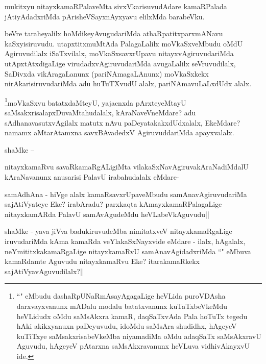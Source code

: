 \begin{artha}
mukitxyu nitayxkamaRPalaveMta sivxVkarisuvudAdare kamaRPalada jAtiyAdadxriMda pArisheVSayxnAyxyavu elilxMda barabeVku.
\end{artha}

\begin{artha}
beVre taraheyalilx hoMdikeyAvugudariMda athaRpatitxparxmANavu kaSxyisiruvudu. utapxtitxmuMtAda PalagaLalilx moVkaSxveMbudu oMdU Agiruvudilalx iSaTxvilalx, moVkaSxsavxrUpavu nitayxvAgiruvudariMda utApxtAtxdigaLige virudadxvAgiruvudariMda avugaLalilx seVruvudilalx, SaDivxda vikAragaLanunx (pariNAmagaLAnunx) moVkaSxkekx nirAkarisiruvudariMda adu huTuTXvudU alalx, pariNAmavuLaLxdUdx alalx.
\end{artha}

\begin{artha}
\footnote{``\stext" eMbudu dashaRpUNaRmAsayAgagaLige heVLida puroVDAsha darxvayxvanunx mADalu modalu batatxvanunx kuTaTxbeVkeMdu heVLidudx oMdu saMsAkxra kamaR, daqSaTxvAda Pala hoTuTx tegedu hAki akikxyanuxn paDeyuvudu, idoMdu saMsAra shudidhx, hAgeyeV kuTiTxye saMsakxrisabeVkeMba niyamadiMa oMdu adaqSaTx saMsAkxravU Aguvudu, hAgeyeV pAtarxna saMsAkxravanunx heVLuva vidhivAkayxvU ide.}moVkaSxvu batatxdaMteyU, yajacnxda pArxteyeMtayU saMsakxrisalapxDuvaMtahudalalx, kAraNaveVneMdare? adu sAdhanavasutxvAgilalx matutx nAvu paDeyatakakxdUdxalalx, EkeMdare? namamx aMtarAtamxna savxBAvadedxV AgiruvuddariMda apayxvalalx.
\end{artha}

\begin{artha}
shaMke --
\end{artha}

\begin{artha}
nitayxkamaRvu savaRkamaRgALigiMta vilakaSxNavAgiruvakAraNadiMdalU kAraNavanunx anusarisi PalavU irabahudalalx eMdare-
\end{artha}


\begin{artha}
samAdhAna - hiVge alalx kamaRsavxrUpaveMbudu samAnavAgiruvudariMa sajAtiVyateye Eke? irabAradu? parxkaqta kAmayxkamaRPalagaLige nitayxkamARda PalavU samAvAgudeMdu heVLabeVkAguvudu||
\end{artha}

\begin{artha}
shaMke - yava jiVva badukiruvudeMba nimitatxveV nitayxkamaRgaLige iruvudariMda kAma kamaRda veYlakaSxNayxvide eMdare - ilalx, hAgalalx, neYmititxkakamaRgaLige nitayxkamaRvU samAnavAgidadxriMda ``\stext" eMbuva kamaRdamte Aguvudu nitayxkamaRvu Eke? itarakamaRkekx sajAtiVyavAguvudilalx?|| 
\end{artha}

